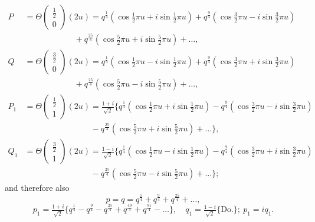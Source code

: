 \documentclass[11pt]{article}
\begin{document}
\begin{align*}
P &= \Theta\!\begin{pmatrix} \tfrac{1}{2} \\ 0 \end{pmatrix}\!(2u) = q^{\tfrac{1}{4}}(\cos\tfrac{1}{2}\pi u + i\sin\tfrac{1}{2}\pi u) + q^{\tfrac{9}{4}}(\cos\tfrac{3}{2}\pi u - i\sin\tfrac{3}{2}\pi u)\\
&\hspace{6em}+ q^{\tfrac{25}{4}}(\cos\tfrac{5}{2}\pi u + i\sin\tfrac{5}{2}\pi u) + \ldots,\\
Q &= \Theta\!\begin{pmatrix} \tfrac{3}{2} \\ 0 \end{pmatrix}\!(2u) = q^{\tfrac{1}{4}}(\cos\tfrac{1}{2}\pi u - i\sin\tfrac{1}{2}\pi u) + q^{\tfrac{9}{4}}(\cos\tfrac{3}{2}\pi u + i\sin\tfrac{3}{2}\pi u)\\
&\hspace{6em}+ q^{\tfrac{25}{4}}(\cos\tfrac{5}{2}\pi u - i\sin\tfrac{5}{2}\pi u) + \ldots,\\
P_1 &= \Theta\!\begin{pmatrix} \tfrac{1}{2} \\ 1 \end{pmatrix}\!(2u) = \tfrac{1 + i}{\sqrt{2}}\bigl\{q^{\tfrac{1}{4}}(\cos\tfrac{1}{2}\pi u + i\sin\tfrac{1}{2}\pi u) - q^{\tfrac{9}{4}}(\cos\tfrac{3}{2}\pi u - i\sin\tfrac{3}{2}\pi u)\\
&\hspace{8em}- q^{\tfrac{25}{4}}(\cos\tfrac{5}{2}\pi u + i\sin\tfrac{5}{2}\pi u) + \ldots\bigr\},\\
Q_1 &= \Theta\!\begin{pmatrix} \tfrac{3}{2} \\ 1 \end{pmatrix}\!(2u) = \tfrac{1 - i}{\sqrt{2}}\bigl\{q^{\tfrac{1}{4}}(\cos\tfrac{1}{2}\pi u - i\sin\tfrac{1}{2}\pi u) - q^{\tfrac{9}{4}}(\cos\tfrac{3}{2}\pi u + i\sin\tfrac{3}{2}\pi u)\\
&\hspace{8em}- q^{\tfrac{25}{4}}(\cos\tfrac{5}{2}\pi u - i\sin\tfrac{5}{2}\pi u) + \ldots\bigr\};
\end{align*}
and therefore also
\[
p = q = q^{\tfrac{1}{4}} + q^{\tfrac{9}{4}} + q^{\tfrac{25}{4}} + \ldots,
\]
\[
p_1 = \tfrac{1 + i}{\sqrt{2}}\bigl\{q^{\tfrac{1}{4}} - q^{\tfrac{9}{4}} - q^{\tfrac{25}{4}} + q^{\tfrac{49}{4}} + q^{\tfrac{81}{4}} - \ldots\bigr\},\quad q_1 = \tfrac{1 - i}{\sqrt{2}}\bigl\{\text{Do.}\bigr\};\ p_1 = iq_1.
\]
\end{document}
